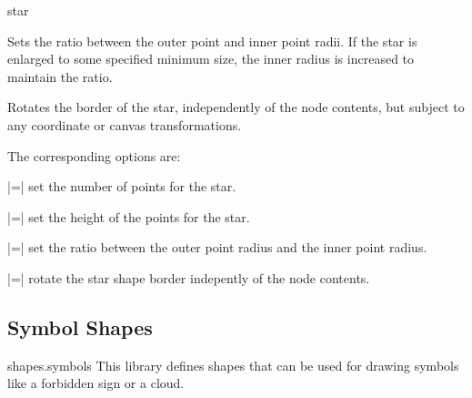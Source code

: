 \begin{shape}{star}
  \begin{command}{\pgfsetstarpointratio{}}
    Sets the ratio between the outer point and inner point radii.		
    If the star is enlarged to some specified minimum size, the
    inner radius is increased to maintain the ratio.	
  \end{command}
  
  \begin{command}{\pgfsetstarrotate{}}
    Rotates the border of the star, independently of the node contents,
    but subject to any coordinate or canvas transformations.	
  \end{command}
  
  The corresponding \tikzname{} options are:
  
  \begin{itemize}
    |=|
    set the number of points for the star.
    
    |=|
    set the height of the points for the star.
    
    |=|
    set the ratio between the outer point radius and the inner point
    radius.
    
    |=|
    rotate the star shape border indepently of the node contents.
    
  \end{itemize}
\end{shape}



\subsection{Symbol Shapes}

\begin{pgflibrary}{shapes.symbols}
  This library defines shapes that can be used for drawing symbols
  like a forbidden sign or a cloud.
\end{pgflibrary}



